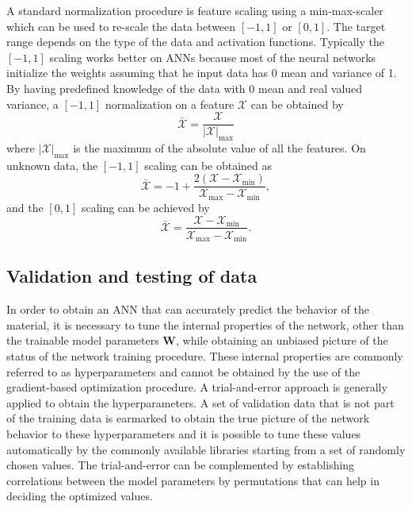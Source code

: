 A standard normalization procedure is feature scaling using a min-max-scaler which can be used to re-scale the data between $ [-1,1] $ or $ [0,1] $. The target range depends on the type of the data and activation functions. Typically the $ [-1,1] $ scaling works better on ANNs because most of the neural networks initialize the weights assuming that he input data has 0 mean and variance of 1. By having predefined knowledge of the data with 0 mean and real valued variance, a $ [-1,1] $ normalization on a feature $ \mathcal{X} $ can be obtained by
\begin{equation}\label{eq-nn-scale}
\bar{\mathcal{X}}=\frac{\mathcal{X}}{|\mathcal{X}|_\text{max}}
\end{equation}
where $ |\mathcal{X}|_\text{max} $ is the maximum of the absolute value of all the features. On unknown data, the $ [-1,1] $ scaling can be obtained as
\begin{equation}\label{eq-nn-scale1}
\bar{\mathcal{X}}=-1+\frac{2\left(\mathcal{X}-\mathcal{X}_\text{min}\right)}{\mathcal{X}_\text{max}-\mathcal{X}_\text{min}},
\end{equation}
and the $ [0,1] $ scaling can be achieved by
\begin{equation}\label{eq-nn-scale2}
\bar{\mathcal{X}}=\frac{\mathcal{X}-\mathcal{X}_\text{min}}{\mathcal{X}_\text{max}-\mathcal{X}_\text{min}}.
\end{equation}

\subsection{Validation and testing of data}
In order to obtain an ANN that can accurately predict the behavior of the material, it is necessary to tune the internal properties of the network, other than the trainable model parameters $ \textbf{W} $, while obtaining an unbiased picture of the status of the network training procedure. These internal properties are commonly referred to as hyperparameters and cannot be obtained by the use of the gradient-based optimization procedure. A trial-and-error approach is generally applied to obtain the hyperparameters. A set of validation data that is not part of the training data is earmarked to obtain the true picture of the network behavior to these hyperparameters and it is possible to tune these values automatically by the commonly available libraries starting from a set of randomly chosen values. The trial-and-error can be complemented by establishing correlations between the model parameters by permutations that can help in deciding the optimized values. 

